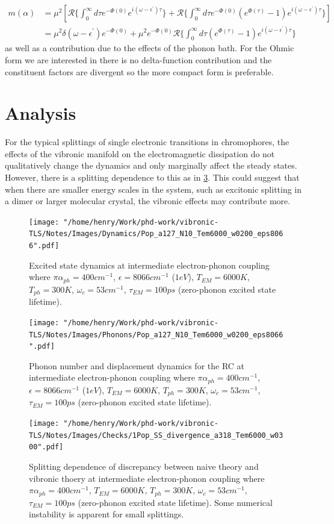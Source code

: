 \documentclass[]{article}
\begin{document}
\begin{itemize}
\begin{itemize}
\begin{equation}
\begin{split}
m(\alpha) &= \mu^2\left[\mathcal{R}\{\int_{0}^{\infty}d\tau e^{-\Phi(0)} e^{i(\omega-\epsilon^{\prime})\tau}\} + \mathcal{R}\{\int_{0}^{\infty}d\tau e^{-\Phi(0)}(e^{\Phi(\tau)}-1) e^{i(\omega-\epsilon^{\prime})\tau}\} \right] \\
&= \mu^2\delta(\omega-\epsilon^{\prime}) e^{-\Phi(0)}  + \mu^2 e^{-\Phi(0)}\mathcal{R}\{\int_{0}^{\infty}d\tau  (e^{\Phi(\tau)}-1)e^{i(\omega-\epsilon^{\prime})\tau}\}
\end{split}
\end{equation}
as well as a contribution due to the effects of the phonon bath. For the Ohmic form we are interested in there is no delta-function contribution and the constituent factors are divergent so the more compact form is preferable.
\section{Analysis}
For the typical splittings of single electronic transitions in chromophores, the effects of the vibronic manifold on the electromagnetic dissipation do not qualitatively change the dynamics and only marginally affect the steady states. However, there is a splitting dependence to this as in \ref{fig:steadystateSplittingDependence}. This could suggest that when there are smaller energy scales in the system, such as excitonic splitting in a dimer or larger molecular crystal, the vibronic effects may contribute more.

\begin{figure}
	\texttt{[image: "/home/henry/Work/phd-work/vibronic-TLS/Notes/Images/Dynamics/Pop\_a127\_N10\_Tem6000\_w0200\_eps8066".pdf]}
	\caption{Excited state dynamics at intermediate electron-phonon coupling where $\pi\alpha_{ph}=400cm^{-1}$, $\epsilon=8066cm^{-1}$ ($1eV$), $T_{EM}=6000K$, $T_{ph}=300K$, $\omega_c=53cm^{-1}$, $\tau_{EM}=100ps$ (zero-phonon excited state lifetime).}
	\label{fig:}
\end{figure}
\begin{figure}
	\texttt{[image: "/home/henry/Work/phd-work/vibronic-TLS/Notes/Images/Phonons/Pop\_a127\_N10\_Tem6000\_w0200\_eps8066".pdf]}
	\caption{Phonon number and displacement dynamics for the RC at intermediate electron-phonon coupling where $\pi\alpha_{ph}=400cm^{-1}$, $\epsilon=8066cm^{-1}$ ($1eV$), $T_{EM}=6000K$, $T_{ph}=300K$, $\omega_c=53cm^{-1}$, $\tau_{EM}=100ps$ (zero-phonon excited state lifetime).}
	\label{fig:}
\end{figure}
\begin{figure}
	\texttt{[image: "/home/henry/Work/phd-work/vibronic-TLS/Notes/Images/Checks/1Pop\_SS\_divergence\_a318\_Tem6000\_w0300".pdf]}
	\caption{Splitting dependence of discrepancy between naive theory and vibronic thoery at intermediate electron-phonon coupling where $\pi\alpha_{ph}=400cm^{-1}$, $T_{EM}=6000K$, $T_{ph}=300K$, $\omega_c=53cm^{-1}$, $\tau_{EM}=100ps$ (zero-phonon excited state lifetime). Some numerical instability is apparent for small splittings.}
	\label{fig:steadystateSplittingDependence} 
\end{figure}


\end{itemize}
\end{itemize}
\end{document}
